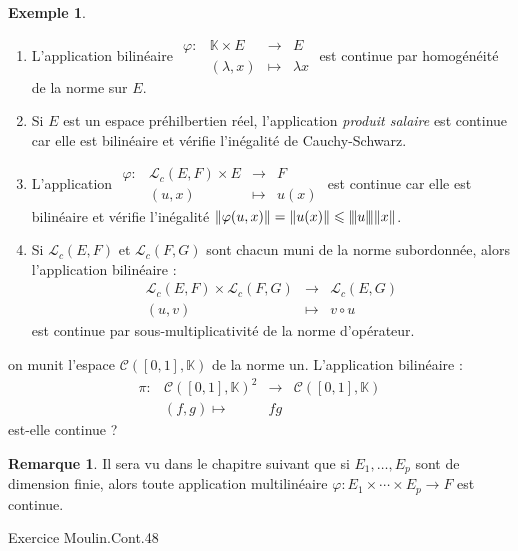 \documentclass[french]{article}
\newcommand{\K}{\mathbb{K}}
\newcommand{\vertiii}[1]{{\left\vert\kern-0.25ex\left\vert\kern-0.25ex\left\vert #1 \right\vert\kern-0.25ex\right\vert\kern-0.25ex\right\vert}}
\theoremstyle{plain}
\theoremstyle{definition}
\newtheorem*{ex}{Exemple}
\newtheorem*{rmq}{Remarque}
\theoremstyle{remark}
\begin{document}
\begin{ex}
	\begin{enumerate}
		\item L'application bilinéaire $\begin{array}{lrcl}
			\varphi:&\K\times E&\longrightarrow&E\\
			&(\lambda,x)&\longmapsto&\lambda x
		\end{array}$ est continue par homogénéité de la norme sur $E$.
		\item Si $E$ est un espace préhilbertien réel, l'application \textit{produit salaire} est continue car elle est bilinéaire et vérifie l'inégalité de Cauchy-Schwarz.
		\item L'application $\begin{array}{lrcl}
			\varphi:&\mathcal{L}_c(E,F)\times E&\longrightarrow&F\\
			&(u,x)&\longmapsto&u(x)
		\end{array}$ est continue car elle est bilinéaire et vérifie l'inégalité $\lVert\varphi(u,x)\rVert=\lVert u(x)\rVert\leqslant\vertiii{u}\lVert x\rVert$.
		\item Si $\mathcal{L}_c(E,F)$ et $\mathcal{L}_c(F,G)$ sont chacun muni de la norme subordonnée, alors l'application bilinéaire : $$\begin{array}{rcl}
			\mathcal{L}_c(E,F)\times\mathcal{L}_c(F,G)&\longrightarrow&\mathcal{L}_c(E,G)\\
			(u,v)&\longmapsto&v\circ u
		\end{array}$$ est continue par sous-multiplicativité de la norme d'opérateur.
	\end{enumerate}
\end{ex}

\begin{exo}
	on munit l'espace $\mathcal{C}([0,1],\K)$ de la norme un. L'application bilinéaire : $$\begin{array}{lrcl}
		\pi:&\mathcal{C}([0,1],\K)^2&\longrightarrow&\mathcal{C}([0,1],\K)\\
		&(f,g)\longmapsto&fg
	\end{array}$$ est-elle continue ?
\end{exo}

\begin{rmq}
	Il sera vu dans le chapitre suivant que si $E_1,\ldots,E_p$ sont de dimension finie, alors toute application multilinéaire $\varphi:E_1\times\cdots\times E_p\to F$ est continue.
\end{rmq}

Exercice Moulin.Cont.48
\end{document}
